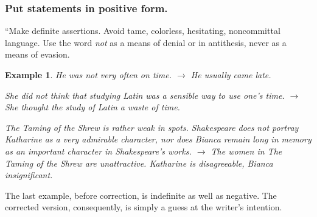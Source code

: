 \documentclass{article}
\newtheorem{example}{Example}
\begin{document}

\subsubsection{Put statements in positive form.}
``Make definite assertions. Avoid tame, colorless, hesitating, noncommittal language. Use the word {\it not} as a means of denial or in antithesis, never as a means of evasion.
\begin{example}
	He was not very often on time. $\to$ He usually came late.
	
	She did not think that studying Latin was a sensible way to use one's time. $\to$ She thought the study of Latin a waste of time.
	
	\emph{The Taming of the Shrew} is rather weak in spots. Shakespeare does not portray Katharine as a very admirable character, nor does Bianca remain long in memory as an important character in Shakespeare's works. $\to$ The women in \emph{The Taming of the Shrew} are unattractive. Katharine is disagreeable, Bianca insignificant.
\end{example}
The last example, before correction, is indefinite as well as negative. The corrected version, consequently, is simply a guess at the writer's intention.
\end{document}
